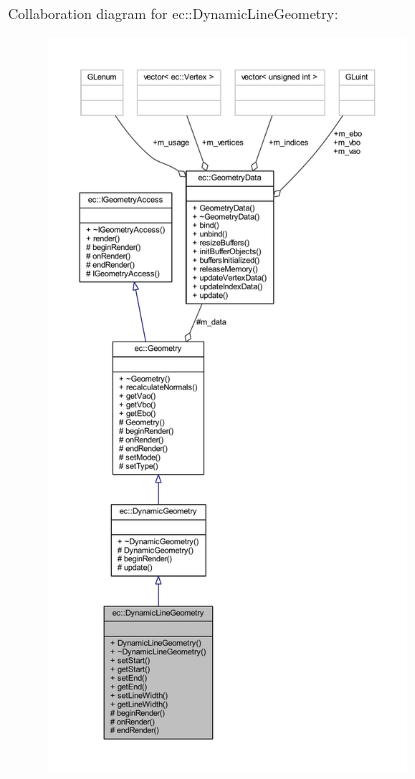 Collaboration diagram for ec\+:\+:Dynamic\+Line\+Geometry\+:\nopagebreak
\begin{figure}[H]
\begin{center}
\leavevmode
\includegraphics[height=550pt]{classec_1_1_dynamic_line_geometry__coll__graph}
\end{center}
\end{figure}
